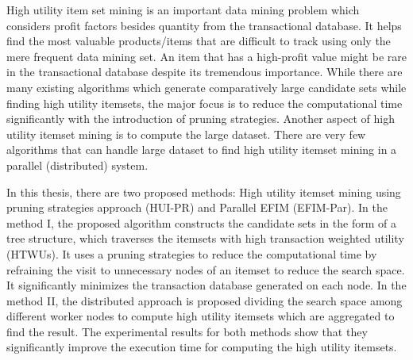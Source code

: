 \documentclass[11pt,openright]{report}
\begin{document}
\thesistitlepage
\copyrightpage

\newpage

\electronicapprovalpage


\begin{thesisabstract}
High utility item set mining is an important data mining problem which considers profit factors besides quantity from the transactional database. It helps find the most valuable products/items that are difficult to track using only the mere frequent data mining set. An item that has a high-profit value might be rare in the transactional database despite its tremendous importance. While there are many existing algorithms which generate comparatively large candidate sets while finding high utility itemsets, the major focus is to reduce the computational time significantly with the introduction of pruning strategies. Another aspect of high utility itemset mining is to compute the large dataset. There are very few algorithms that can handle large dataset to find high utility itemset mining in a parallel (distributed) system.

In this thesis, there are two proposed methods: High utility itemset mining using pruning strategies approach (HUI-PR) and Parallel EFIM (EFIM-Par). In the method I, the proposed algorithm constructs the candidate sets in the form of a tree structure, which traverses the itemsets with high transaction weighted utility (HTWUs). It uses a pruning strategies to reduce the computational time by refraining the visit to unnecessary nodes of an itemset to reduce the search space. It significantly minimizes the transaction database generated on each node. In the method II, the distributed approach is proposed dividing the search space among different worker nodes to compute high utility itemsets which are aggregated to find the result. The experimental results for both methods show that they significantly improve the execution time for computing the high utility itemsets.
\end{thesisabstract}


\end{document}
